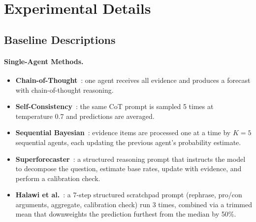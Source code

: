 \section{Experimental Details}
\label{sec:appendix_details}

\subsection{Baseline Descriptions}

\paragraph{ Single-Agent Methods.}
\begin{itemize}[nosep]
    \item \textbf{Chain-of-Thought}~\citep{wei2022chain}: one agent receives all evidence and produces a forecast with chain-of-thought reasoning.
    \item \textbf{Self-Consistency}~\citep{wangself}: the same CoT prompt is sampled 5 times at temperature 0.7 and predictions are averaged.
    \item \textbf{Sequential Bayesian}~\citep{shi2023language}: evidence items are processed one at a time by $K{=}5$ sequential agents, each updating the previous agent's probability estimate.
    \item \textbf{Superforecaster}~\citep{karger2024forecastbench}: a structured reasoning prompt that instructs the model to decompose the question, estimate base rates, update with evidence, and perform a calibration check.
    \item \textbf{Halawi et al.}~\citep{halawi2024approaching}: a 7-step structured scratchpad prompt (rephrase, pro/con arguments, aggregate, calibration check) run 3 times, combined via a trimmed mean that downweights the prediction furthest from the median by 50\%.
\end{itemize}

